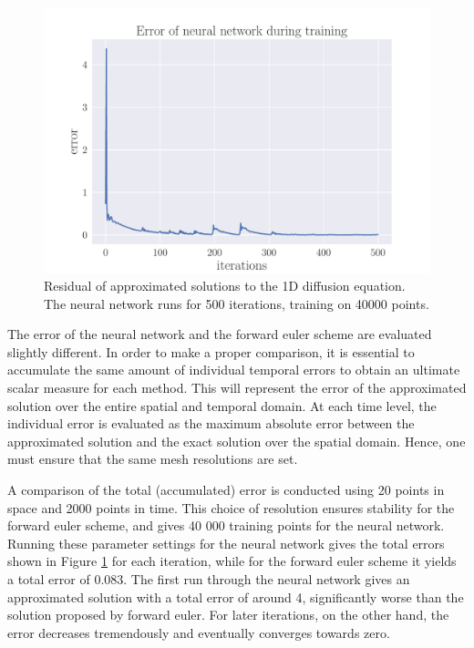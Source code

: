 \documentclass[12pt]{extarticle}
\begin{document}
\begin{figure}[h]
	\centering
	\includegraphics[scale=0.5]{../output/plots/NN_diffusion_error_40000}
	\caption{Residual of approximated solutions to the 1D diffusion equation. The neural network runs for 500 iterations, training on 40000 points.}
	\label{fig:error_NN_40000}
\end{figure}

The error of the neural network and the forward euler scheme are evaluated slightly different. In order to make a proper comparison, it is essential to accumulate the same amount of individual temporal errors to obtain an ultimate scalar measure for each method. This will represent the error of the approximated solution over the entire spatial and temporal domain. At each time level, the individual error is evaluated as the maximum absolute error between the approximated solution and the exact solution over the spatial domain. Hence, one must ensure that the same mesh resolutions are set.
\par A comparison of the total (accumulated) error is conducted using 20 points in space and 2000 points in time. This choice of resolution ensures stability for the forward euler scheme, and gives 40 000 training points for the neural network. Running these parameter settings for the neural network gives the total errors shown in Figure \ref{fig:error_NN_40000} for each iteration, while for the forward euler scheme it yields a total error of 0.083. The first run through the neural network gives an approximated solution with a total error of around 4, significantly worse than the solution proposed by forward euler. For later iterations, on the other hand, the error decreases tremendously and eventually converges towards zero.
\end{document}

